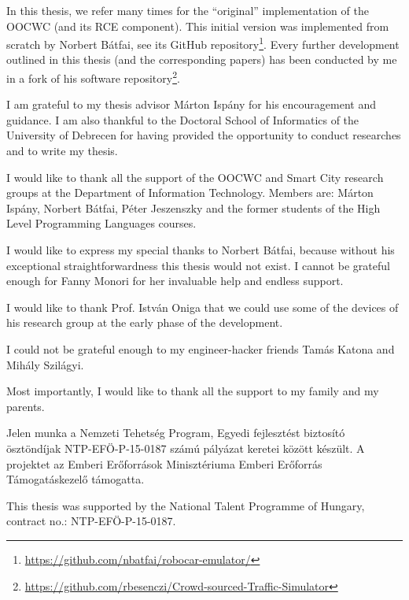 \documentclass[b5paper,12pt]{report}
\theoremstyle{definition}
\begin{document}
\begin{singlespace}
\footnotesize

\noindent
In this thesis, we refer many times for the \enquote{original} implementation of the OOCWC (and its RCE component). This initial version was implemented from scratch by Norbert Bátfai, see its GitHub repository\footnote{\url{https://github.com/nbatfai/robocar-emulator/}}. Every further development outlined in this thesis (and the corresponding papers) has been conducted by me in a fork of his software repository\footnote{\url{https://github.com/rbesenczi/Crowd-sourced-Traffic-Simulator}}.

\noindent
I am grateful to my thesis advisor Márton Ispány for his encouragement and guidance. I am also thankful to the Doctoral School of Informatics of the University of Debrecen for having provided the opportunity to conduct researches and to write my thesis.

\noindent
I would like to thank all the support of the OOCWC and Smart City research groups at the Department of Information Technology. Members are: Márton Ispány, Norbert Bátfai, Péter Jeszenszky and the former students of the High Level Programming Languages courses.

\noindent
I would like to express my special thanks to Norbert Bátfai, because without his exceptional straightforwardness this thesis would not exist. I cannot be grateful enough for Fanny Monori for her invaluable help and endless support.

\noindent
I would like to thank Prof. István Oniga that we could use some of the devices of his research group at the early phase of the development.

\noindent
I could not be grateful enough to my engineer-hacker friends Tamás Katona and Mihály Szilágyi.

\noindent
Most importantly, I would like to thank all the support to my family and my parents.

\noindent
Jelen munka a Nemzeti Tehetség Program, Egyedi fejlesztést biztosító ösztöndíjak NTP-EFÖ-P-15-0187 számú pályázat keretei között készült. A projektet az Emberi Erőforrások Minisztériuma Emberi Erőforrás Támogatáskezelő támogatta.

\noindent
This thesis was supported by the National Talent Programme of Hungary, contract no.: NTP-EFÖ-P-15-0187.


\end{singlespace}
\end{document}
